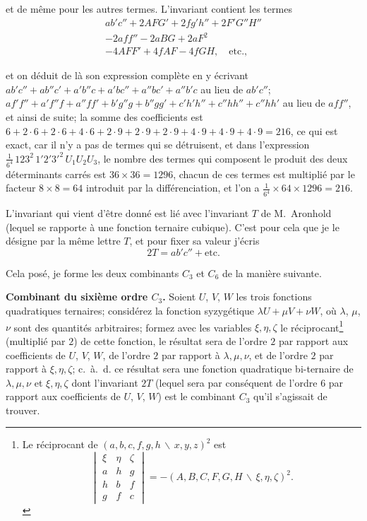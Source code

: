 \documentclass[11pt,a4paper]{book}
\begin{document}
et de m\^{e}me pour les autres termes. L'invariant contient les termes
\begin{multline*}
ab'c'' + 2AFG' + 2fg'h'' + 2F'G''H'' \\
- 2aff'' - 2aBG + 2aF^{2} \\
- 4AFF' + 4fAF - 4fGH, \quad \text{etc.},
\end{multline*}

et on d\'{e}duit de l\`{a} son expression compl\`{e}te en y \'{e}crivant
$ab'c''+ab''c'+a'b''c+a'bc''+a''bc'+a''b'c$ au lieu de $ab'c''$;
$af'f''+a'f''f+a''ff'+b'g''g+b''gg'+c'h'h''+c''hh''+c''hh'$ au lieu de $aff''$,
et ainsi de suite; la somme des coefficients est $6 + 2\cdot 6 + 2\cdot 6 + 4\cdot 6 +
2\cdot 9 + 2\cdot 9 + 2\cdot 9 + 4\cdot 9 + 4\cdot 9 + 4\cdot 9 = 216$, ce qui est exact, car
il n'y a pas de termes qui se d\'{e}truisent, et dans l'expression
$\frac{1}{6^{4}}\,123^{2}\,1'2'3'^{2}\,U_{1}U_{2}U_{3}$, le nombre des termes qui composent
le produit des deux d\'{e}terminants carr\'{e}s est $36 \times 36 = 1296$, chacun de ces termes
est multipli\'{e} par le facteur $8 \times 8 = 64$ introduit par la diff\'{e}renciation, et
l'on a $\frac{1}{6^{4}} \times 64 \times 1296 = 216$.

L'invariant qui vient d'\^{e}tre donn\'{e} est li\'{e} avec l'invariant $T$ de M.~Aronhold
(lequel se rapporte \`{a} une fonction ternaire cubique). C'est pour cela que je le d\'{e}signe
par la m\^{e}me lettre $T$, et pour fixer sa valeur j'\'{e}cris
\[2T = ab'c'' + \text{etc.}\]

Cela pos\'{e}, je forme les deux combinants $C_{3}$ et $C_{6}$ de la mani\`{e}re suivante.

\textbf{Combinant du sixi\`{e}me ordre $C_{3}$.} Soient $U$, $V$, $W$ les trois fonctions
quadratiques ternaires; consid\'{e}rez la fonction syzyg\'{e}tique $\lambda U + \mu V + \nu W$,
o\`{u} $\lambda$, $\mu$, $\nu$ sont des quantit\'{e}s arbitraires; formez avec les variables
$\xi, \eta, \zeta$ le r\'{e}ciprocant\footnote{Le r\'{e}ciprocant de $(a,b,c,f,g,h\,\backslash\!\!\,x,y,z)^{2}$
est
\[\begin{vmatrix}\xi & \eta & \zeta \\ a & h & g \\ h & b & f \\ g & f & c\end{vmatrix}
= -(A,B,C,F,G,H\,\backslash\!\!\,\xi,\eta,\zeta)^{2}.\]}
(multipli\'{e} par $2$) de cette fonction, le r\'{e}sultat sera de l'ordre $2$ par rapport
aux coefficients de $U$, $V$, $W$, de l'ordre $2$ par rapport \`{a} $\lambda, \mu, \nu$, et de
l'ordre $2$ par rapport \`{a} $\xi, \eta, \zeta$; c.~\`{a}.~d. ce r\'{e}sultat sera une fonction
quadratique bi-ternaire de $\lambda, \mu, \nu$ et $\xi, \eta, \zeta$ dont l'invariant $2T$
(lequel sera par cons\'{e}quent de l'ordre $6$ par rapport aux coefficients de $U$, $V$, $W$)
est le combinant $C_{3}$ qu'il s'agissait de trouver.
\end{document}
